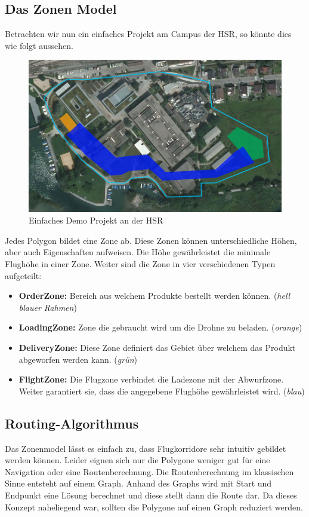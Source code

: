 \subsection{Das Zonen Model}
Betrachten wir nun ein einfaches Projekt am Campus der HSR, so könnte dies wie folgt aussehen. \\
\begin{figure}[h]
	\includegraphics[width=1.0\textwidth]{images/routing/simpleProject_example.png}
	\caption{Einfaches Demo Projekt an der HSR}
	\label{fig:demo-project}
\end{figure}
Jedes Polygon bildet eine Zone ab. Diese Zonen können unterschiedliche Höhen, aber auch Eigenschaften aufweisen. Die Höhe gewährleistet die minimale Flughöhe in einer Zone. Weiter sind die Zone in vier verschiedenen Typen aufgeteilt: 
\begin{itemize}
	\item{\textbf{OrderZone:} Bereich aus welchem Produkte bestellt werden können. (\textit{hell blauer Rahmen})}
	\item{\textbf{LoadingZone:} Zone die gebraucht wird um die Drohne zu beladen. (\textit{orange})}
	\item{\textbf{DeliveryZone:} Diese Zone definiert das Gebiet über welchem das Produkt abgeworfen werden kann. (\textit{grün})}
	\item{\textbf{FlightZone:} Die Flugzone verbindet die Ladezone mit der Abwurfzone. Weiter garantiert sie, dass die angegebene Flughöhe gewährleistet wird. (\textit{blau})}
\end{itemize}

\subsection{Routing-Algorithmus}
Das Zonenmodel lässt es einfach zu, dass Flugkorridore sehr intuitiv gebildet werden können. Leider eignen sich nur die Polygone weniger gut für eine Navigation oder eine Routenberechnung. Die Routenberechnung im klassischen Sinne entsteht auf einem Graph. Anhand des Graphs wird mit Start und Endpunkt eine Lösung berechnet und diese stellt dann die Route dar. Da dieses Konzept naheliegend war, sollten die Polygone auf einen Graph reduziert werden.

